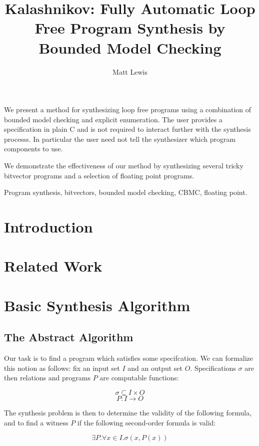 \documentclass[a4paper]{llncs}
\title{{\sc Kalashnikov}: Fully Automatic Loop Free Program Synthesis by Bounded Model Checking}
\author{Matt Lewis}
\institute{Oxford University}
\newenvironment{keywords}{
       \list{}{\advance\topsep by0.35cm\relax\small
       \leftmargin=0cm
       \labelwidth=0.35cm
       \listparindent=0.35cm
       \itemindent\listparindent
       \rightmargin\leftmargin}\item[\hskip\labelsep
                                     \bfseries Keywords:]}
     {\endlist}
\begin{document}
%
\maketitle
%
\pagestyle{headings}  %

\abstract
We present a method for synthesizing loop free programs using a combination of
bounded model checking and explicit enumeration.  The user provides a specification
in plain C and is not required to interact further with the synthesis processs.
In particular the user need not tell the synthesizer which program components to
use.

We demonstrate the effectiveness of our method by synthesizing several tricky
bitvector programs and a selection of floating point programs.


\begin{keywords}
 Program synthesis, bitvectors, bounded model checking, CBMC,
 floating point.
\end{keywords}

\section{Introduction}

\section{Related Work}

\section{Basic Synthesis Algorithm}

\subsection{The Abstract Algorithm}

Our task is to find a program which satisfies some specifcation.  We can formalize this
notion as follows: fix an input set $I$ and an output set $O$.  Specifications $\sigma$
are then relations and programs $P$ are computable functions:

$$ \sigma \subseteq I \times O $$
$$ P : I \rightarrow O$$

The synthesis problem is then to determine the validity of the following formula, and
to find a witness $P$ if the following second-order formula is valid:

$$\exists P . \forall x \in I . \sigma(x, P(x))$$
\end{document}
